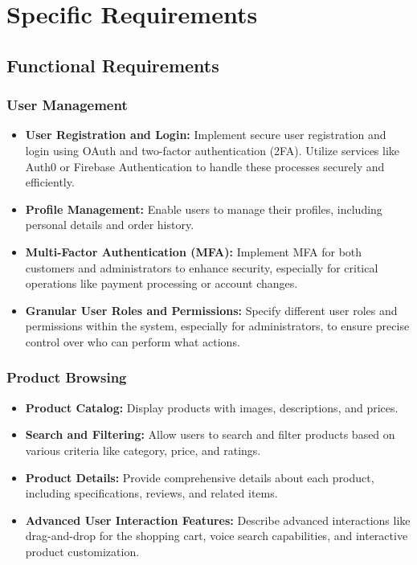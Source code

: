 \documentclass[11pt]{article}
\begin{document}
	\section*{Specific Requirements}
	
	\subsection*{Functional Requirements}
	
	\subsubsection*{User Management}
	\begin{itemize}
		\item \textbf{User Registration and Login:} Implement secure user registration and login using OAuth and two-factor authentication (2FA). Utilize services like Auth0 or Firebase Authentication to handle these processes securely and efficiently.
		\item \textbf{Profile Management:} Enable users to manage their profiles, including personal details and order history.
		\item \textbf{Multi-Factor Authentication (MFA):} Implement MFA for both customers and administrators to enhance security, especially for critical operations like payment processing or account changes.
		\item \textbf{Granular User Roles and Permissions:} Specify different user roles and permissions within the system, especially for administrators, to ensure precise control over who can perform what actions.
	\end{itemize}
	
	\subsubsection*{Product Browsing}
	\begin{itemize}
		\item \textbf{Product Catalog:} Display products with images, descriptions, and prices.
		\item \textbf{Search and Filtering:} Allow users to search and filter products based on various criteria like category, price, and ratings.
		\item \textbf{Product Details:} Provide comprehensive details about each product, including specifications, reviews, and related items.
		\item \textbf{Advanced User Interaction Features:} Describe advanced interactions like drag-and-drop for the shopping cart, voice search capabilities, and interactive product customization.
	\end{itemize}
	
\end{document}
